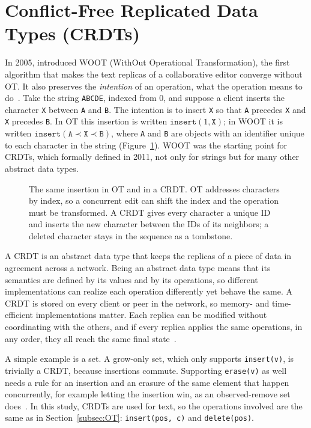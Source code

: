 \section{Conflict-Free Replicated Data Types (CRDTs)}
\label{sec:crdt}

In 2005, \citet{oster2005real} introduced WOOT (WithOut Operational Transformation), the first algorithm that makes the text replicas of a collaborative editor converge without OT. It also preserves the \emph{intention} of an operation, what the operation means to do~\citep{Li2004}. Take the string \texttt{ABCDE}, indexed from $0$, and suppose a client inserts the character \texttt{X} between \texttt{A} and \texttt{B}. The intention is to insert \texttt{X} so that \texttt{A} precedes \texttt{X} and \texttt{X} precedes \texttt{B}. In OT this insertion is written $\texttt{insert}(1, \texttt{X})$; in WOOT it is written $\texttt{insert}(\texttt{A} \prec \texttt{X} \prec \texttt{B})$, where \texttt{A} and \texttt{B} are objects with an identifier unique to each character in the string (Figure~\ref{fig:2:crdt-insert}). WOOT was the starting point for CRDTs, which \citet{Shapiro2011} formally defined in 2011, not only for strings but for many other abstract data types.

\begin{figure}[htbp]
    \centering
    
    \caption[The same insertion in OT and in a CRDT]{The same insertion in OT and in a CRDT. OT addresses characters by index, so a concurrent edit can shift the index and the operation must be transformed. A CRDT gives every character a unique ID and inserts the new character between the IDs of its neighbors; a deleted character stays in the sequence as a tombstone.}
    \label{fig:2:crdt-insert}
\end{figure}

A CRDT is an abstract data type that keeps the replicas of a piece of data in agreement across a network. Being an abstract data type means that its semantics are defined by its values and by its operations, so different implementations can realize each operation differently yet behave the same. A CRDT is stored on every client or peer in the network, so memory- and time-efficient implementations matter. Each replica can be modified without coordinating with the others, and if every replica applies the same operations, in any order, they all reach the same final state~\citep{Shapiro2011, CRDToverview2}.

A simple example is a set. A grow-only set, which only supports \texttt{insert(v)}, is trivially a CRDT, because insertions commute. Supporting \texttt{erase(v)} as well needs a rule for an insertion and an erasure of the same element that happen concurrently, for example letting the insertion win, as an observed-remove set does~\citep{Shapiro2011}. In this study, CRDTs are used for text, so the operations involved are the same as in Section~\ref{subsec:OT}: \texttt{insert(pos, c)} and \texttt{delete(pos)}.

